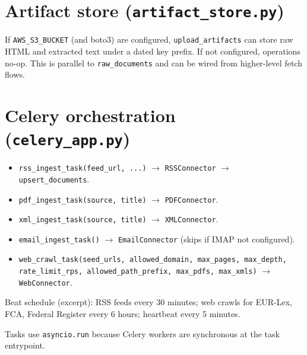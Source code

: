 \documentclass[11pt,a4paper]{article}
\begin{document}
\section{Artifact store (\texttt{artifact\_store.py})}

If \texttt{AWS\_S3\_BUCKET} (and boto3) are configured, \texttt{upload\_artifacts} can store raw HTML and extracted text under a dated key prefix. If not configured, operations no-op. This is parallel to \texttt{raw\_documents} and can be wired from higher-level fetch flows.

\section{Celery orchestration (\texttt{celery\_app.py})}

\begin{itemize}
  \item \texttt{rss\_ingest\_task(feed\_url, ...)} $\rightarrow$ \texttt{RSSConnector} $\rightarrow$ \texttt{upsert\_documents}.
  \item \texttt{pdf\_ingest\_task(source, title)} $\rightarrow$ \texttt{PDFConnector}.
  \item \texttt{xml\_ingest\_task(source, title)} $\rightarrow$ \texttt{XMLConnector}.
  \item \texttt{email\_ingest\_task()} $\rightarrow$ \texttt{EmailConnector} (skips if IMAP not configured).
  \item \texttt{web\_crawl\_task(seed\_urls, allowed\_domain, max\_pages, max\_depth, rate\_limit\_rps, allowed\_path\_prefix, max\_pdfs, max\_xmls)} $\rightarrow$ \texttt{WebConnector}.
\end{itemize}

Beat schedule (excerpt): RSS feeds every 30 minutes; web crawls for EUR-Lex, FCA, Federal Register every 6 hours; heartbeat every 5 minutes.

Tasks use \texttt{asyncio.run} because Celery workers are synchronous at the task entrypoint.
\end{document}
